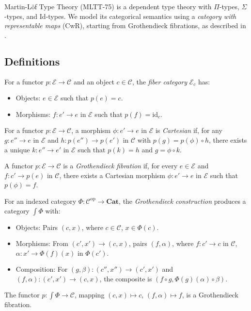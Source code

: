 \documentclass{article}
\begin{document}
Martin-Löf Type Theory (MLTT-75) is a dependent type theory with $\Pi$-types,
$\Sigma$-types, and Id-types. We model its categorical semantics using
a \emph{category with representable maps} (CwR), starting from Grothendieck
fibrations, as described in \cite{uemura}.

\subsection{Definitions}
\begin{definition}
For a functor \(p : \mathcal{E} \to \mathcal{C}\) and an object \(c \in \mathcal{C}\), the \emph{fiber category} \(\mathcal{E}_c\) has:
\begin{itemize}
    \item Objects: \(e \in \mathcal{E}\) such that \(p(e) = c\).
    \item Morphisms: \(f : e' \to e\) in \(\mathcal{E}\) such that \(p(f) = \mathrm{id}_c\).
\end{itemize}
\end{definition}

\begin{definition}
For a functor \(p : \mathcal{E} \to \mathcal{C}\), a morphism \(\phi : e' \to e\) in \(\mathcal{E}\) is \emph{Cartesian} if, for any \(g : e'' \to e\) in \(\mathcal{E}\) and \(h : p(e'') \to p(e')\) in \(\mathcal{C}\) with \(p(g) = p(\phi) \circ h\), there exists a unique \(k : e'' \to e'\) in \(\mathcal{E}\) such that \(p(k) = h\) and \(g = \phi \circ k\).
\end{definition}

\begin{definition}
A functor \(p : \mathcal{E} \to \mathcal{C}\) is a \emph{Grothendieck fibration} if, for every \(e \in \mathcal{E}\) and \(f : c' \to p(e)\) in \(\mathcal{C}\), there exists a Cartesian morphism \(\phi : e' \to e\) in \(\mathcal{E}\) such that \(p(\phi) = f\).
\end{definition}

\begin{definition}
For an indexed category \(\Phi : \mathcal{C}^{\mathrm{op}} \to \mathbf{Cat}\), the \emph{Grothendieck construction} produces a category \(\int \Phi\) with:
\begin{itemize}
    \item Objects: Pairs \((c, x)\), where \(c \in \mathcal{C}\), \(x \in \Phi(c)\).
    \item Morphisms: From \((c', x') \to (c, x)\), pairs \((f, \alpha)\), where \(f : c' \to c\) in \(\mathcal{C}\), \(\alpha : x' \to \Phi(f)(x)\) in \(\Phi(c')\).
    \item Composition: For \((g, \beta) : (c'', x'') \to (c', x')\) and \((f, \alpha) : (c', x') \to (c, x)\), the composite is \((f \circ g, \Phi(g)(\alpha) \circ \beta)\).
\end{itemize}
The functor \(p : \int \Phi \to \mathcal{C}\), mapping \((c, x) \mapsto c\), \((f, \alpha) \mapsto f\), is a Grothendieck fibration.
\end{definition}
\end{document}
